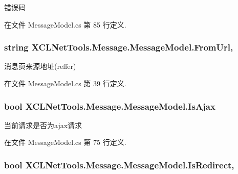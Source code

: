 错误码 



在文件 Message\-Model.\-cs 第 85 行定义.

\hypertarget{class_x_c_l_net_tools_1_1_message_1_1_message_model_afa48da00ef35d78d182c025a1f0dcbc0}{
\subsubsection[{From\-Url}]{\setlength{\rightskip}{0pt plus 5cm}string X\-C\-L\-Net\-Tools.\-Message.\-Message\-Model.\-From\-Url\hspace{0.3cm}{\ttfamily [get]}, {\ttfamily [set]}}}\label{class_x_c_l_net_tools_1_1_message_1_1_message_model_afa48da00ef35d78d182c025a1f0dcbc0}


消息页来源地址(reffer) 



在文件 Message\-Model.\-cs 第 39 行定义.

\hypertarget{class_x_c_l_net_tools_1_1_message_1_1_message_model_ad0286a8e34c0cd7495034ac04c4d0ada}{
\subsubsection[{Is\-Ajax}]{\setlength{\rightskip}{0pt plus 5cm}bool X\-C\-L\-Net\-Tools.\-Message.\-Message\-Model.\-Is\-Ajax\hspace{0.3cm}{\ttfamily [get]}}}\label{class_x_c_l_net_tools_1_1_message_1_1_message_model_ad0286a8e34c0cd7495034ac04c4d0ada}


当前请求是否为ajax请求 



在文件 Message\-Model.\-cs 第 75 行定义.

\hypertarget{class_x_c_l_net_tools_1_1_message_1_1_message_model_a167c5dfe1818b0685dc7ceca3c1ed5ba}{
\subsubsection[{Is\-Redirect}]{\setlength{\rightskip}{0pt plus 5cm}bool X\-C\-L\-Net\-Tools.\-Message.\-Message\-Model.\-Is\-Redirect\hspace{0.3cm}{\ttfamily [get]}, {\ttfamily [set]}}}\label{class_x_c_l_net_tools_1_1_message_1_1_message_model_a167c5dfe1818b0685dc7ceca3c1ed5ba}


